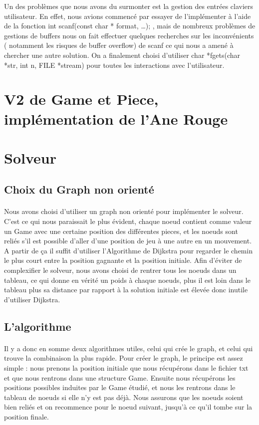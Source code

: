 \documentclass {article}
\begin{document}
Un des problèmes que nous avons du surmonter est la gestion des entrées claviers utilisateur. En effet, nous avions commencé par essayer de l'implémenter à l'aide de la fonction \og int scanf(const char * format, …); \fg{}, mais de nombreux problèmes de gestions de buffers nous on fait effectuer quelques recherches sur les inconvénients ( notamment les risques de buffer overflow)  de scanf ce qui nous a amené à chercher une autre solution. On a finalement choisi d'utiliser \og char *fgets(char *str, int n, FILE *stream) \fg{} pour toutes les interactions avec l'utilisateur.

\section{V2 de Game et Piece, implémentation de l'Ane Rouge}
\paragraph{}

\section{Solveur}
\subsection{Choix du Graph non orienté}
\paragraph{}
Nous avons choisi d'utiliser un graph non orienté pour implémenter le solveur. C'est ce qui nous paraissait le plus évident, chaque noeud contient comme valeur un Game avec une certaine position des différentes pieces, et les noeuds sont reliés s'il est possible d'aller d'une position de jeu à une autre en un mouvement. A partir de ça il suffit d'utiliser l'Algorithme de Dijkstra pour regarder le chemin le plus court entre la position gagnante et la position initiale. Afin d'éviter de complexifier le solveur, nous avons choisi de rentrer tous les noeuds dans un tableau, ce qui donne en vérité un poids à chaque noeuds, plus il est loin dans le tableau plus sa distance par rapport à la solution initiale est élevée donc inutile d'utiliser Dijkstra.

\subsection{L'algorithme}
\paragraph{}
Il y a donc en somme deux algorithmes utiles, celui qui crée le graph, et celui qui trouve la combinaison la plus rapide. Pour créer le graph, le principe est assez simple : nous prenons la position initiale que nous récupérons dans le fichier txt et que nous rentrons dans une structure Game. Ensuite nous récupérons les positions possibles induites par le Game étudié, et nous les rentrons dans le tableau de noeuds si elle n'y est pas déjà. Nous assurons que les noeuds soient bien reliés et on recommence pour le noeud suivant, jusqu'à ce qu'il tombe sur la position finale.
\end{document}
